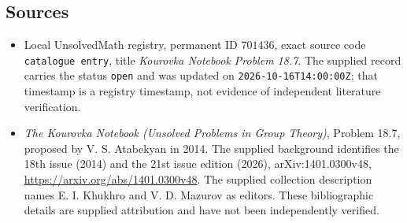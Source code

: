 \documentclass[11pt]{article}
\begin{document}
\subsection{Sources}
\begin{itemize}
\item Local UnsolvedMath registry, permanent ID \(701436\), exact source code \texttt{catalogue entry}, title \emph{Kourovka Notebook Problem 18.7}. The supplied record carries the status \texttt{open} and was updated on \texttt{2026-10-16T14:00:00Z}; that timestamp is a registry timestamp, not evidence of independent literature verification.
\item \emph{The Kourovka Notebook (Unsolved Problems in Group Theory)}, Problem 18.7, proposed by V. S. Atabekyan in 2014. The supplied background identifies the 18th issue (2014) and the 21st issue edition (2026), arXiv:1401.0300v48, \url{https://arxiv.org/abs/1401.0300v48}. The supplied collection description names E. I. Khukhro and V. D. Mazurov as editors. These bibliographic details are supplied attribution and have not been independently verified.
\end{itemize}
\end{document}

